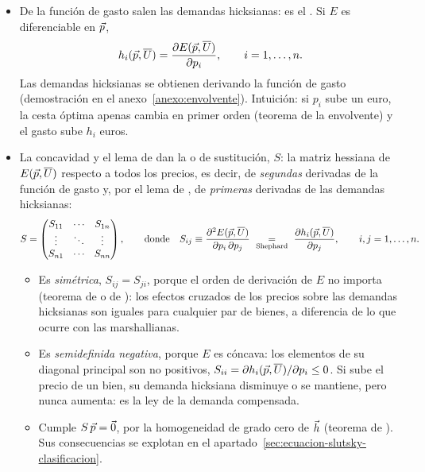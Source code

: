 \documentclass[11pt]{article}
\begin{document}
\begin{itemize}
\item De la función de gasto salen las demandas hicksianas: es el \nocite{Shephard1953Cost,McKenzie1957Demand}. Si $E$ es diferenciable en $\vec{p}$,
    \begin{equation}
    h_i(\vec{p},\overline{U})=\frac{\partial E(\vec{p},\overline{U})}{\partial p_i},\qquad i=1,\dots,n. \label{eq:shephard}
    \end{equation}
    Las demandas hicksianas se obtienen derivando la función de gasto (demostración en el anexo~\ref{anexo:envolvente}). Intuición: si $p_i$ sube un euro, la cesta óptima apenas cambia en primer orden (teorema de la envolvente) y el gasto sube $h_i$ euros.
\item La concavidad y el lema de  dan la  o de sustitución, $S$: la matriz hessiana de $E(\vec{p},\overline{U})$ respecto a todos los precios, es decir, de \emph{segundas} derivadas de la función de gasto y, por el lema de , de \emph{primeras} derivadas de las demandas hicksianas:
    \begin{equation}
    S=\begin{pmatrix} S_{11} & \cdots & S_{1n}\\ \vdots & \ddots & \vdots\\ S_{n1} & \cdots & S_{nn}\end{pmatrix},\qquad\text{donde}\quad S_{ij}\equiv\frac{\partial^2E(\vec{p},\overline{U})}{\partial p_i\,\partial p_j}\ \underset{\text{Shephard}}{=}\ \frac{\partial h_i(\vec{p},\overline{U})}{\partial p_j},\qquad i,j=1,\dots,n. \label{eq:matriz-slutsky}
    \end{equation}
    \begin{itemize}
    \item Es \emph{simétrica}, $S_{ij}=S_{ji}$, porque el orden de derivación de $E$ no importa (teorema de  o de ): los efectos cruzados de los precios sobre las demandas hicksianas son iguales para cualquier par de bienes, a diferencia de lo que ocurre con las marshallianas.
    \item Es \emph{semidefinida negativa}, porque $E$ es cóncava: los elementos de su diagonal principal son no positivos, $S_{ii}=\partial h_i(\vec{p},\overline{U})/\partial p_i\leq 0$. Si sube el precio de un bien, su demanda hicksiana disminuye o se mantiene, pero nunca aumenta: es la ley de la demanda compensada.
    \item Cumple $S\,\vec{p}=\vec{0}$, por la homogeneidad de grado cero de $\vec{h}$ (teorema de ). Sus consecuencias se explotan en el apartado~\ref{sec:ecuacion-slutsky-clasificacion}.
    \end{itemize}
\end{itemize}
\end{document}
